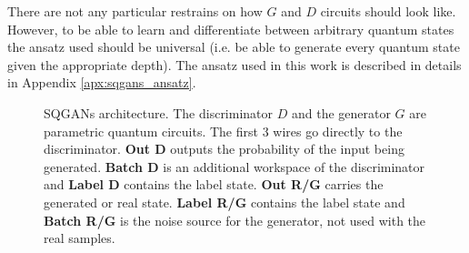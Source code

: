 There are not any particular restrains on how $G$ and $D$ circuits should look
like. However, to be able to learn and differentiate between arbitrary quantum
states the ansatz used should be universal (i.e. be able to generate every
quantum state given the appropriate depth). The ansatz used in this
work is described in details in Appendix \ref{apx:sqgans_ansatz}.

\begin{figure}[htbp!]
  \caption{SQGANs architecture. The discriminator $D$ and the generator $G$ are
    parametric quantum circuits. The first 3 wires go
    directly to the discriminator. \textbf{Out D} outputs the probability of the
  input being generated. \textbf{Batch D} is an additional workspace of the
  discriminator and \textbf{Label D} contains the label state. \textbf{Out R/G}
  carries the generated or real state. \textbf{Label R/G} contains the label
  state and \textbf{Batch R/G} is the noise source for the generator, not used
  with the real samples.\label{fig:SQGANs_circuit} }
\end{figure}


